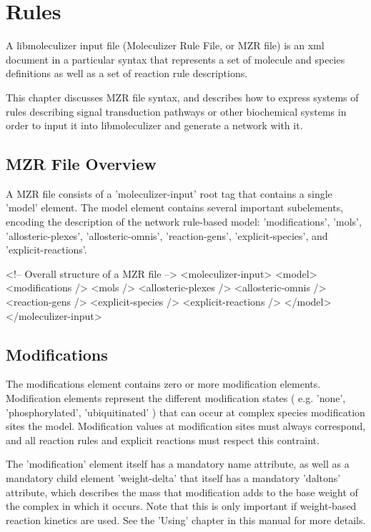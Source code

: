 \chapter{Rules}
A libmoleculizer input file (Moleculizer Rule File, or MZR
file) is an xml document in a particular syntax that represents a set
of molecule and species definitions as well as a set of reaction rule
descriptions.

This chapter discusses MZR file syntax, and describes how to express
systems of rules describing signal transduction pathways or other
biochemical systems in order to input it into libmoleculizer and
generate a network with it.

\section{MZR File Overview}
A MZR file consists of a 'moleculizer-input' root tag that contains a
single 'model' element.  The model element contains several important
subelements, encoding the description of the network rule-based model:
'modifications', 'mols', 'allosteric-plexes', 'allosteric-omnis',
'reaction-gens', 'explicit-species', and 'explicit-reactions'.

<!-- Overall structure of a MZR file -->
<moleculizer-input>
  <model>
    <modifications />
    <mols />
    <allosteric-plexes />
    <allosteric-omnis />
    <reaction-gens />
    <explicit-species />
    <explicit-reactions />
  </model>
</moleculizer-input>

\section{Modifications}
The modifications element contains zero or more modification
elements.  Modification elements represent the different modification
states ( e.g. 'none', 'phosphorylated', 'ubiquitinated' ) that can
occur at complex species modification sites the model. Modification
values at modification sites must always correspond, and all reaction
rules and explicit reactions must respect this contraint.  

The 'modification' element itself has a mandatory name attribute, as
well as a mandatory child element 'weight-delta' that itself has a
mandatory 'daltons' attribute, which describes the mass that
modification adds to the base weight of the complex in which it
occurs.  Note that this is only important if weight-based reaction
kinetics are used.  See the 'Using' chapter in this manual for more details.

